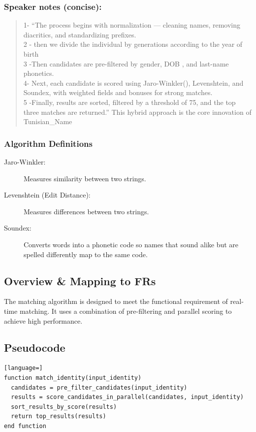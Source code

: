 \subsubsection*{Speaker notes (concise):}
\begin{quote}
1- “The process begins with normalization — cleaning names, removing diacritics, and standardizing prefixes. \\
2 - then we divide the individual by generations according to the year of birth \\
3 -Then candidates are pre-filtered by gender, DOB , and last-name phonetics. \\
4- Next, each candidate is scored using Jaro-Winkler(), Levenshtein, and Soundex, with weighted fields and bonuses for strong matches. \\
5 -Finally, results are sorted, filtered by a threshold of 75, and the top three matches are returned.”
This hybrid approach is the core innovation of Tunisian\_Name
\end{quote}

\subsubsection*{Algorithm Definitions}
\begin{description}
    \item[Jaro-Winkler:] Measures similarity between two strings.
    \item[Levenshtein (Edit Distance):] Measures differences between two strings.
    \item[Soundex:] Converts words into a phonetic code so names that sound alike but are spelled differently map to the same code.
\end{description}

\subsection{Overview \& Mapping to FRs}
The matching algorithm is designed to meet the functional requirement of real-time matching. It uses a combination of pre-filtering and parallel scoring to achieve high performance.

\subsection{Pseudocode}
\begin{lstlisting}[language=]
function match_identity(input_identity)
  candidates = pre_filter_candidates(input_identity)
  results = score_candidates_in_parallel(candidates, input_identity)
  sort_results_by_score(results)
  return top_results(results)
end function
\end{lstlisting}

